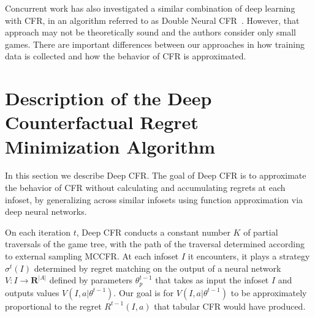 \documentclass{article}
\begin{document}
Concurrent work has also investigated a similar combination of deep learning with CFR, in an algorithm referred to as Double Neural CFR~\cite{Li18:Double}.  However, that approach may not be theoretically sound and the authors consider only small games. There are important differences between our approaches in how training data is collected and how the behavior of CFR is approximated.

\section{Description of the Deep Counterfactual Regret Minimization Algorithm}
\vspace{-0.03in}
In this section we describe Deep CFR. The goal of Deep CFR is to approximate the behavior of CFR without calculating and accumulating regrets at each infoset, by generalizing across similar infosets using function approximation via deep neural networks.



On each iteration $t$, Deep CFR conducts a constant number $K$ of partial traversals of the game tree, with the path of the traversal determined according to external sampling MCCFR. At each infoset $I$ it encounters, it plays a strategy $\sigma^t(I)$ determined by regret matching on the output of a neural network $V: I \to \mathbf{R}^{|A|}$ defined by parameters $\theta^{t-1}_p$ that takes as input the infoset $I$ and outputs values $V(I,a|\theta^{t-1})$. Our goal is for $V(I,a|\theta^{t-1})$ to be approximately proportional to the regret $R^{t-1}(I,a)$ that tabular CFR would have produced.
\end{document}

